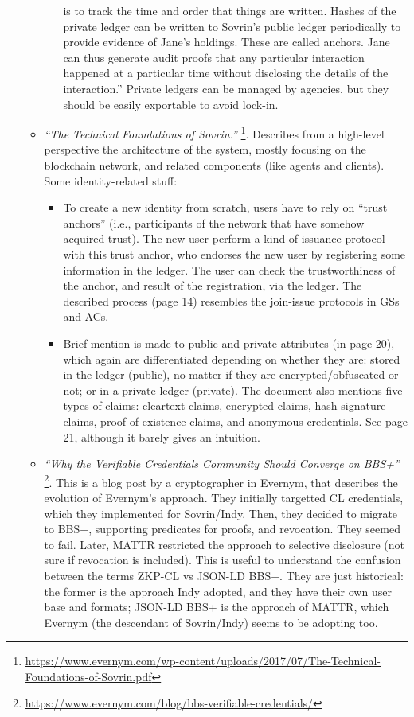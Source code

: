 \begin{itemize}
\begin{itemize}
\begin{itemize}
{        is to track the time and order that things are written. Hashes of the
        private ledger can be written to Sovrin's public ledger periodically to
        provide evidence of Jane's holdings. These are called anchors. Jane can
        thus generate audit proofs that any particular interaction happened at a
        particular time without disclosing the details of the interaction.''}
      Private ledgers can be managed by agencies, but they should be easily
      exportable to avoid lock-in.
    \end{itemize}
  \item \emph{``The Technical Foundations of Sovrin.''}%
    \footnote{\url{https://www.evernym.com/wp-content/uploads/2017/07/The-Technical-Foundations-of-Sovrin.pdf}}.
    Describes from a high-level perspective the architecture of the system,
    mostly focusing on the blockchain network, and related components (like
    agents and clients). Some identity-related stuff:
    \begin{itemize}
    \item To create a new identity from scratch, users have to rely on ``trust
      anchors'' (i.e., participants of the network that have somehow acquired
      trust). The new user perform a kind of issuance protocol with this trust
      anchor, who endorses the new user by registering some information in the
      ledger. The user can check the trustworthiness of the anchor, and result
      of the registration, via the ledger. The described process (page 14)
      resembles the join-issue protocols in GSs and ACs.      
    \item Brief mention is made to public and private attributes (in page 20),
      which again are differentiated depending on whether they are: stored in
      the ledger (public), no matter if they are encrypted/obfuscated or not;
      or in a private ledger (private). %
      The document also mentions five types of claims: cleartext claims,
      encrypted claims, hash signature claims, proof of existence claims, and
      anonymous credentials. See page 21, although it barely gives an
      intuition.      
    \end{itemize}
  \item \emph{``Why the Verifiable Credentials Community Should Converge on BBS+''}%
    \footnote{\url{https://www.evernym.com/blog/bbs-verifiable-credentials/}}.
    This is a blog post by a cryptographer in Evernym, that describes the
    evolution of Evernym's approach. They initially targetted CL credentials,
    which they implemented for Sovrin/Indy. Then, they decided to migrate to
    BBS+, supporting predicates for proofs, and revocation. They seemed to fail.
    Later, MATTR restricted the approach to selective disclosure (not sure if
    revocation is included). This is useful to understand the confusion between
    the terms ZKP-CL vs JSON-LD BBS+. They are just historical: the former is the
    approach Indy adopted, and they have their own user base and formats;
    JSON-LD BBS+ is the approach of MATTR, which Evernym (the descendant of
    Sovrin/Indy) seems to be adopting too.
  \end{itemize}
\end{itemize}


